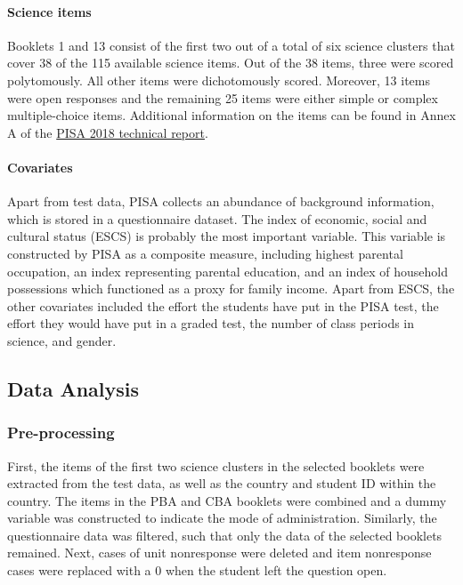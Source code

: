 \documentclass{article}
\begin{document}
\paragraph{Science items}

Booklets 1 and 13 consist of the first two out of a total of six science clusters that cover 38 of the 115 available science items. Out of the 38 items, three were scored polytomously. All other items were dichotomously scored. Moreover, 13 items were open responses and the remaining 25 items were either simple or complex multiple-choice items. Additional information on the items can be found in Annex A of the \href{https://www.oecd.org/pisa/data/pisa2018technicalreport/}{PISA 2018 technical report}.

\paragraph{Covariates} \label{sec:cov} Apart from test data, PISA collects an abundance of background information, which is stored in a questionnaire dataset. The index of economic, social and cultural status (ESCS) is probably the most important variable. This variable is constructed by PISA as a composite measure, including highest parental occupation, an index representing parental education, and an index of household possessions which functioned as a proxy for family income. Apart from ESCS, the other covariates included the effort the students have put in the PISA test, the effort they would have put in a graded test, the number of class periods in science, and gender.

\subsection{Data Analysis}

\subsubsection{Pre-processing} \label{sec:pre-processing}
First, the items of the first two science clusters in the selected booklets were extracted from the test data, as well as the country and student ID within the country. The items in the PBA and CBA booklets were combined and a dummy variable was constructed to indicate the mode of administration. Similarly, the questionnaire data was filtered, such that only the data of the selected booklets remained. Next, cases of unit nonresponse were deleted and item nonresponse cases were replaced with a 0 when the student left the question open.
\end{document}
